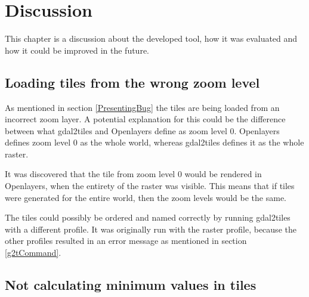 \chapter{Discussion}\label{CDiscussion}

This chapter is a discussion about the developed tool, how it was evaluated and how it could be improved in the future.

\section{Loading tiles from the wrong zoom level}\label{WhyWrongLevel}

As mentioned in section \ref{PresentingBug} the tiles are being loaded from an incorrect zoom layer. A potential explanation for this could be the difference between what gdal2tiles and Openlayers define as zoom level 0. Openlayers defines zoom level 0 as the whole world, whereas gdal2tiles defines it as the whole raster. 

It was discovered that the tile from zoom level 0 would be rendered in Openlayers, when the entirety of the raster was visible. This means that if tiles were generated for the entire world, then the zoom levels would be the same. 

The tiles could possibly be ordered and named correctly by running gdal2tiles with a different profile.  It was originally run with the raster profile, because the other profiles resulted in an error message as mentioned in section \ref{g2tCommand}. 

\section{Not calculating minimum values in tiles} \label{WhyNoMin}

